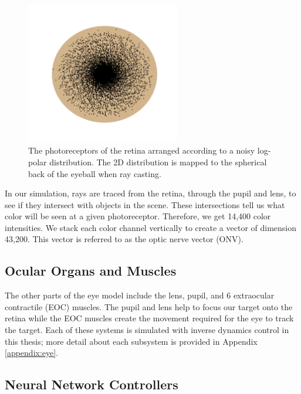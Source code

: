 \documentclass[../taasin.tex]{subfiles}
\begin{document}
\begin{figure}[h]
    \centering
    \includegraphics[width=0.6\textwidth]{figures/retina_log_polar.pdf}
    \caption{The photoreceptors of the retina arranged according to a noisy log-polar distribution. The 2D distribution is mapped to the spherical back of the eyeball when ray casting.}
    \label{fig:task_log_polar_retina}
\end{figure}

In our simulation, rays are traced from the retina, through the pupil and lens, to see if they intersect with objects in the scene. These intersections tell us what color will be seen at a given photoreceptor. Therefore, we get 14,400 color intensities. We stack each color channel vertically to create a vector of dimension 43,200. This vector is referred to as the optic nerve vector (ONV).


\subsection{Ocular Organs and Muscles}

The other parts of the eye model include the lens, pupil, and 6 extraocular contractile (EOC) muscles. The pupil and lens help to focus our target onto the retina while the EOC muscles create the movement required for the eye to track the target. Each of these systems is simulated with inverse dynamics control in this thesis; more detail about each subsystem is provided in Appendix \ref{appendix:eye}.


\subsection{Neural Network Controllers}
\end{document}
